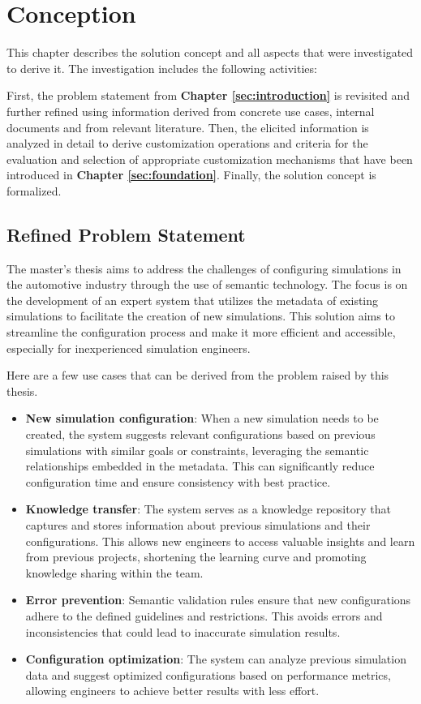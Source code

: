 \section{Conception\label{sec:conception}}

This chapter describes the solution concept and all aspects that were investigated to derive it.
The investigation includes the following activities:

First, the problem statement from \textbf{Chapter \ref{sec:introduction}} is revisited and further refined using information derived from concrete use cases, internal documents and from relevant literature.
Then, the elicited information is analyzed in detail to derive customization operations and criteria for the evaluation and selection of appropriate customization mechanisms that have been introduced in \textbf{Chapter \ref{sec:foundation}}. Finally, the solution concept is formalized.


\subsection{Refined Problem Statement}
The master's thesis aims to address the challenges of configuring simulations in the automotive industry through the use of semantic technology. The focus is on the development of an expert system that utilizes the metadata of existing simulations to facilitate the creation of new simulations. This solution aims to streamline the configuration process and make it more efficient and accessible, especially for inexperienced simulation engineers.

Here are a few use cases that can be derived from the problem raised by this thesis.

\begin{itemize}
    \item \textbf{New simulation configuration}: When a new simulation needs to be created, the system suggests relevant configurations based on previous simulations with similar goals or constraints, leveraging the semantic relationships embedded in the metadata. This can significantly reduce configuration time and ensure consistency with best practice.
    \item \textbf{Knowledge transfer}: The system serves as a knowledge repository that captures and stores information about previous simulations and their configurations. This allows new engineers to access valuable insights and learn from previous projects, shortening the learning curve and promoting knowledge sharing within the team.
    \item \textbf{Error prevention}: Semantic validation rules ensure that new configurations adhere to the defined guidelines and restrictions. This avoids errors and inconsistencies that could lead to inaccurate simulation results.
    \item \textbf{Configuration optimization}: The system can analyze previous simulation data and suggest optimized configurations based on performance metrics, allowing engineers to achieve better results with less effort.
\end{itemize}


